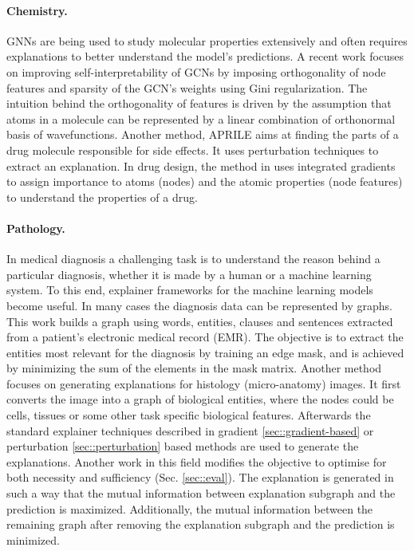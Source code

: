 \paragraph{Chemistry.} GNNs are being used to study molecular properties extensively and often requires explanations to better understand the model's predictions. A recent work \cite{henderson2021improving} focuses on improving self-interpretability of GCNs by imposing orthogonality of node features and sparsity of the GCN's weights using Gini regularization. The intuition behind the orthogonality of features is driven by the assumption that atoms in a molecule can be represented by a linear combination of orthonormal basis of wavefunctions. Another method, APRILE \cite{xu2021aprile} aims at finding the parts of a drug molecule responsible for side effects. It uses perturbation techniques to extract an explanation. In drug design, the method in \cite{jimenez2021coloring} uses integrated gradients \cite{sundararajan2017axiomatic} to assign importance to atoms (nodes) and the atomic properties (node features) to understand the properties of a drug.



\paragraph{Pathology.} In medical diagnosis a challenging task is to understand the reason behind a particular diagnosis, whether it is made by a human or a machine learning system. To this end, explainer frameworks for the machine learning models become useful. In many cases the diagnosis data can be represented by graphs. This work \cite{wu2021counterfactual} builds a graph using words, entities, clauses and sentences extracted from a patient's electronic medical record (EMR). The objective is to extract the entities most relevant for the diagnosis by training an edge mask, and is achieved by minimizing the sum of the elements in the mask matrix. Another method~\cite{jaume2021quantifying} focuses on generating explanations for histology (micro-anatomy) images. It first converts the image into a graph of biological entities, where the nodes could be cells, tissues or some other task specific biological features. Afterwards the standard explainer techniques described in gradient \ref{sec::gradient-based} or perturbation \ref{sec::perturbation} based methods are used to generate the explanations. Another work \cite{yu2021towards} in this field modifies the objective to optimise for both necessity and sufficiency (Sec. \ref{sec::eval}). The explanation is generated in such a way that the mutual information between explanation subgraph and the prediction is maximized. Additionally, the mutual information between the remaining graph after removing the explanation subgraph and the prediction is minimized. %




